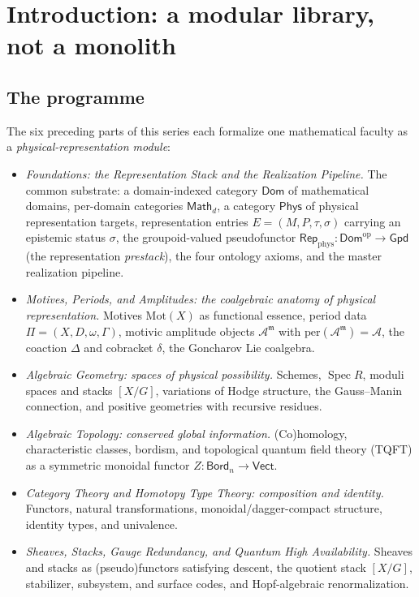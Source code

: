 \documentclass[12pt]{article}
\theoremstyle{definition}
\theoremstyle{remark}
\newcommand{\Dom}{\mathsf{Dom}}
\newcommand{\Math}{\mathsf{Math}}
\newcommand{\Phys}{\mathsf{Phys}}
\newcommand{\Gpd}{\mathsf{Gpd}}
\newcommand{\Vect}{\mathsf{Vect}}
\newcommand{\Bord}{\mathsf{Bord}}
\newcommand{\Repphys}{\mathsf{Rep}_{\mathrm{phys}}}
\newcommand{\op}{\mathrm{op}}
\newcommand{\per}{\mathrm{per}}
\newcommand{\Spec}{\operatorname{Spec}}
\newcommand{\Amp}{\mathcal{A}}
\newcommand{\Ampm}{\mathcal{A}^{\mathfrak{m}}}
\newcommand{\Mot}{\mathrm{Mot}}
\newcommand{\PI}{\textsc{i}}
\newcommand{\PII}{\textsc{ii}}
\newcommand{\PIII}{\textsc{iii}}
\newcommand{\PIV}{\textsc{iv}}
\newcommand{\PV}{\textsc{v}}
\newcommand{\PVI}{\textsc{vi}}
\begin{document}
\tableofcontents

\section{Introduction: a modular library, not a monolith}
\label{sec:intro}

\subsection{The programme}

The six preceding parts of this series each formalize one mathematical faculty as a
\emph{physical-representation module}:

\begin{itemize}[leftmargin=2.2em]
\item[\textbf{Part~\PI.}] \emph{Foundations: the Representation Stack and the
Realization Pipeline.}  The common substrate: a domain-indexed category $\Dom$ of
mathematical domains, per-domain categories $\Math_d$, a category $\Phys$ of physical
representation targets, representation entries $E=(M,P,\tau,\sigma)$ carrying an
epistemic status $\sigma$, the groupoid-valued pseudofunctor $\Repphys:\Dom^\op\to\Gpd$
(the representation \emph{prestack}), the four ontology axioms, and the master
realization pipeline.
\item[\textbf{Part~\PII.}] \emph{Motives, Periods, and Amplitudes: the coalgebraic
anatomy of physical representation.}  Motives $\Mot(X)$ as functional essence, period
data $\Pi=(X,D,\omega,\Gamma)$, motivic amplitude objects $\Ampm$ with
$\per(\Ampm)=\Amp$, the coaction $\Delta$ and cobracket $\delta$, the Goncharov Lie
coalgebra.
\item[\textbf{Part~\PIII.}] \emph{Algebraic Geometry: spaces of physical
possibility.}  Schemes, $\Spec R$, moduli spaces and stacks $[X/G]$, variations of
Hodge structure, the Gauss--Manin connection, and positive geometries with recursive
residues.
\item[\textbf{Part~\PIV.}] \emph{Algebraic Topology: conserved global information.}
(Co)homology, characteristic classes, bordism, and topological quantum field theory
(TQFT) as a symmetric monoidal functor $Z:\Bord_n\to\Vect$.
\item[\textbf{Part~\PV.}] \emph{Category Theory and Homotopy Type Theory: composition
and identity.}  Functors, natural transformations, monoidal/dagger-compact structure,
identity types, and univalence.
\item[\textbf{Part~\PVI.}] \emph{Sheaves, Stacks, Gauge Redundancy, and Quantum
High Availability.}  Sheaves and stacks as (pseudo)functors satisfying descent, the
quotient stack $[X/G]$, stabilizer, subsystem, and surface codes, and Hopf-algebraic
renormalization.
\end{itemize}
\end{document}
